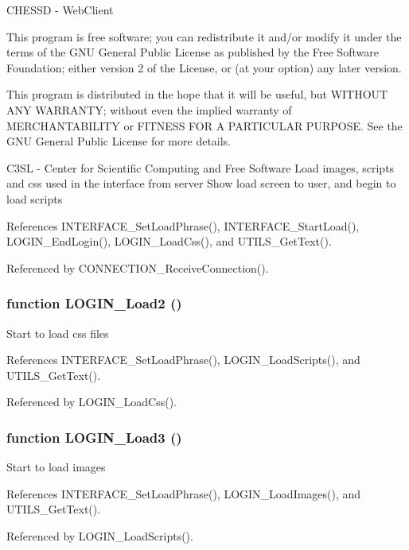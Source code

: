 CHESSD - WebClient

This program is free software; you can redistribute it and/or modify it under the terms of the GNU General Public License as published by the Free Software Foundation; either version 2 of the License, or (at your option) any later version.

This program is distributed in the hope that it will be useful, but WITHOUT ANY WARRANTY; without even the implied warranty of MERCHANTABILITY or FITNESS FOR A PARTICULAR PURPOSE. See the GNU General Public License for more details.

C3SL - Center for Scientific Computing and Free Software Load images, scripts and css used in the interface from server Show load screen to user, and begin to load scripts 

References INTERFACE\_\-SetLoadPhrase(), INTERFACE\_\-StartLoad(), LOGIN\_\-EndLogin(), LOGIN\_\-LoadCss(), and UTILS\_\-GetText().

Referenced by CONNECTION\_\-ReceiveConnection().
\subsubsection{\setlength{\rightskip}{0pt plus 5cm}function LOGIN\_\-Load2 ()}\label{login_2load_8js_ab13616c61cedc41a233a117bf4432c7}


Start to load css files 

References INTERFACE\_\-SetLoadPhrase(), LOGIN\_\-LoadScripts(), and UTILS\_\-GetText().

Referenced by LOGIN\_\-LoadCss().
\subsubsection{\setlength{\rightskip}{0pt plus 5cm}function LOGIN\_\-Load3 ()}\label{login_2load_8js_cf1f3753731146f6b976d39c11812ca7}


Start to load images 

References INTERFACE\_\-SetLoadPhrase(), LOGIN\_\-LoadImages(), and UTILS\_\-GetText().

Referenced by LOGIN\_\-LoadScripts().
